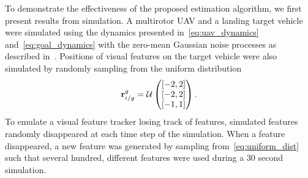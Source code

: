 
To demonstrate the effectiveness of the proposed estimation algorithm, we first
present results from simulation.
A multirotor UAV and a landing target vehicle were simulated using the dynamics presented
in~\eqref{eq:uav_dynamics} and~\eqref{eq:goal_dynamics} with the zero-mean
Gaussian noise processes as described
in~.
Positions of visual features on the target vehicle
were also simulated by randomly sampling from the uniform distribution
\begin{equation}
  \vect{r}_{i/g}^g = \mathcal{U}
  \left( \begin{matrix}
    \left[ -2, 2 \right] \\
    \left[ -2, 2 \right] \\
    \left[ -1, 1 \right] 
  \end{matrix}
  \right).
  \label{eq:uniform_dist}
\end{equation}
To emulate a visual feature tracker losing track of features, simulated features
randomly disappeared at each time step of the simulation.
When a feature disappeared, a new feature was generated by sampling
from~\eqref{eq:uniform_dist}
such that several
hundred, different features were used during a 30 second simulation.

